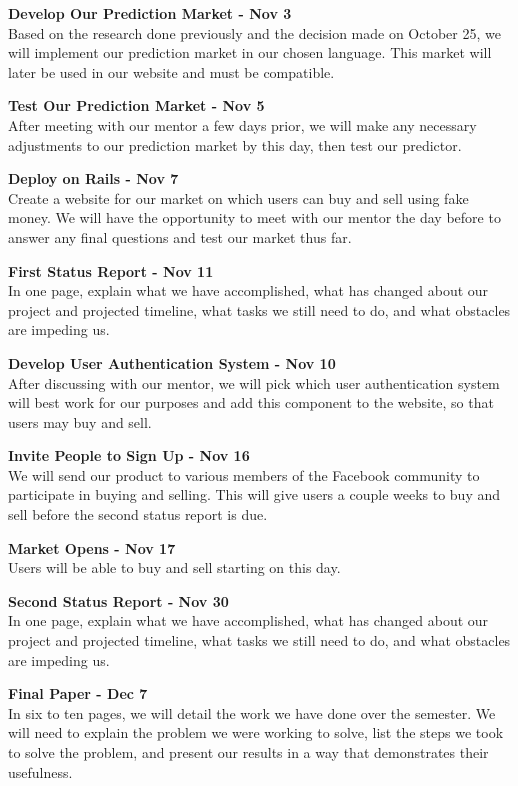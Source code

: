 \documentclass[12pt]{article}
\begin{document}
\noindent
\textbf{Develop Our Prediction Market - Nov 3} \\
Based on the research done previously and the decision made on October 25, we will implement our prediction market in our chosen language. This market will later be used in our website and must be compatible.

\noindent
\textbf{Test Our Prediction Market - Nov 5} \\
After meeting with our mentor a few days prior, we will make any necessary adjustments to our prediction market by this day, then test our predictor.

\noindent
\textbf{Deploy on Rails - Nov 7} \\
Create a website for our market on which users can buy and sell using fake money. We will have the opportunity to meet with our mentor the day before to answer any final questions and test our market thus far.

\noindent
\textbf{First Status Report - Nov 11} \\
In one page, explain what we have accomplished, what has changed about our project
and projected timeline, what tasks we still need to do, and what obstacles
are impeding us.

\noindent
\textbf{Develop User Authentication System - Nov 10} \\
After discussing with our mentor, we will pick which user authentication system will best work for our purposes and add this component to the website, so that users may buy and sell. 

\noindent
\textbf{Invite People to Sign Up - Nov 16} \\
We will send our product to various members of the Facebook community to participate in buying and selling. This will give users a couple weeks to buy and sell before the second status report is due.

\noindent
\textbf{Market Opens - Nov 17} \\
Users will be able to buy and sell starting on this day.

\noindent
\textbf{Second Status Report - Nov 30} \\
In one page, explain what we have accomplished, what has changed about our project
and projected timeline, what tasks we still need to do, and what obstacles
are impeding us.

\noindent
\textbf{Final Paper - Dec 7} \\
In six to ten pages, we will detail the work we have done over the semester. We
will need to explain the problem we were working to solve, list the steps
we took to solve the problem, and present our results in a way that 
demonstrates their usefulness.
\end{document}
